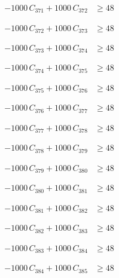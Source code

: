 \documentclass[a4paper,11pt]{article}
\begin{document}
\begin{align}
-1000\,C_{371} + 1000\,C_{372} &\geq 48 \nonumber
\end{align}

\begin{align}
-1000\,C_{372} + 1000\,C_{373} &\geq 48 \nonumber
\end{align}

\begin{align}
-1000\,C_{373} + 1000\,C_{374} &\geq 48 \nonumber
\end{align}

\begin{align}
-1000\,C_{374} + 1000\,C_{375} &\geq 48 \nonumber
\end{align}

\begin{align}
-1000\,C_{375} + 1000\,C_{376} &\geq 48 \nonumber
\end{align}

\begin{align}
-1000\,C_{376} + 1000\,C_{377} &\geq 48 \nonumber
\end{align}

\begin{align}
-1000\,C_{377} + 1000\,C_{378} &\geq 48 \nonumber
\end{align}

\begin{align}
-1000\,C_{378} + 1000\,C_{379} &\geq 48 \nonumber
\end{align}

\begin{align}
-1000\,C_{379} + 1000\,C_{380} &\geq 48 \nonumber
\end{align}

\begin{align}
-1000\,C_{380} + 1000\,C_{381} &\geq 48 \nonumber
\end{align}

\begin{align}
-1000\,C_{381} + 1000\,C_{382} &\geq 48 \nonumber
\end{align}

\begin{align}
-1000\,C_{382} + 1000\,C_{383} &\geq 48 \nonumber
\end{align}

\begin{align}
-1000\,C_{383} + 1000\,C_{384} &\geq 48 \nonumber
\end{align}

\begin{align}
-1000\,C_{384} + 1000\,C_{385} &\geq 48 \nonumber
\end{align}
\end{document}
